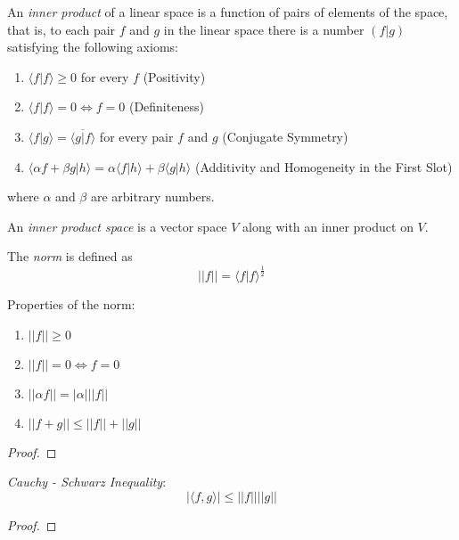 \documentclass[conference,12pt,onecolumn,compsoc]{IEEEtran}
\begin{document}
\begin{definition}
An \emph{inner product} of a linear space is a function of pairs of elements of the space, that is, to each pair $f$ and $g$ in the linear space there is a number $(f|g)$ satisfying the following axioms:
\begin{enumerate}[(1)]
	\item $\langle f|f\rangle \geq 0$ for every $f$ (Positivity)
	\item $\langle f|f\rangle = 0 \Leftrightarrow f=0$ (Definiteness)
	\item $\langle f|g\rangle = \overline{\langle g|f\rangle}$ for every pair $f$ and $g$ (Conjugate Symmetry)
	\item $\langle\alpha f + \beta g | h\rangle = \alpha\langle f|h\rangle + \beta\langle g|h\rangle$ (Additivity and Homogeneity in the First Slot)
\end{enumerate}
where $\alpha$ and $\beta$ are arbitrary numbers. 
\end{definition}

\begin{definition}
An \emph{inner product space} is a vector space $V$ along with an inner product on $V$. 
\end{definition}

\begin{definition}
The \emph{norm} is defined as
\begin{equation}
||f|| = \langle f|f\rangle^{\frac{1}{2}}
\label{norm}
\end{equation}
\end{definition}

\begin{proposition}
Properties of the norm:
\begin{enumerate}[(1)]
	\item $||f|| \geq 0$
	\item $||f|| = 0 \Leftrightarrow f = 0$
	\item $||\alpha f|| = |\alpha| ||f||$
	\item $||f+g|| \leq ||f|| + ||g||$
\end{enumerate}
\end{proposition}
\begin{proof}

\end{proof}

\begin{proposition}
\emph{Cauchy - Schwarz Inequality}:
\begin{equation}
|\langle f,g\rangle|\leq ||f|| ||g||
\label{schwarz}
\end{equation}
\end{proposition}
\begin{proof}

\end{proof}
\end{document}
